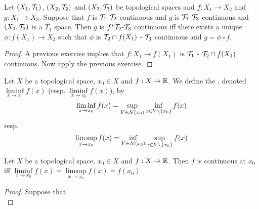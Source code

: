 \documentclass{book}
\begin{document}
	\begin{ex} 
	Let $(X_1, \mathcal{T}_1)$, $(X_2, \mathcal{T}_2)$ and $(X_3, \mathcal{T}_3)$ be topological spaces and $f: X_1 \rightarrow X_2$ and $g:X_1 \rightarrow X_3$. Suppose that $f$ is $\mathcal{T}_1$-$\mathcal{T}_2$ continuous and $g$ is $\mathcal{T}_1$-$\mathcal{T}_3$ continuous and $(X_3, \mathcal{T}_3)$ is a $T_1$ space. Then $g$ is $f^*\mathcal{T}_2$-$\mathcal{T}_3$ continuous iff there exists a unique $\phi: f(X_1) \rightarrow X_3$ such that $\phi$ is $\mathcal{T}_2 \cap f(X_1)$ - $\mathcal{T}_3$ continuous and $g = \phi \circ f$. \\
	\end{ex}
	
	\begin{proof}
	A previous exercise implies that $f: X_1 \rightarrow f(X_1)$ is $\mathcal{T}_1$ - $\mathcal{T}_2 \cap f(X_1)$ continuous. Now apply the previous exercise. 
	\end{proof}
	
	\begin{defn} 
		Let $X$ be a topological space, $x_0 \in X$ and $f:X \rightarrow \mathbb{R}$. We define the , denoted $\liminf\limits_{x \rightarrow x_0}f(x)$ (resp. $\liminf\limits_{x \rightarrow x_0}f(x)$), by 
		$$\liminf_{x \rightarrow x_0} f(x) = \sup_{V \in \mathcal{N}(x_0)} \inf_{x \in V \setminus \{x_0\}} f(x)$$
		resp. 
		$$\limsup_{x \rightarrow x_0} f(x) = \inf_{V \in \mathcal{N}(x_0)} \sup_{x \in V \setminus \{x_0\}} f(x)$$
	\end{defn}

	\begin{ex} 
		Let $X$ be a topological space, $x_0 \in X$ and $f:X \rightarrow \mathbb{R}$. Then $f$ is continuous at $x_0$ iff $\liminf\limits_{x \rightarrow x_0}f(x) = \limsup\limits_{x \rightarrow x_0}f(x) = f(x_0)$ 
	\end{ex}

	\begin{proof}
		Suppose that \\
	\end{proof}
\end{document}
